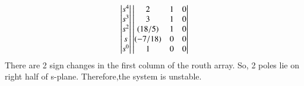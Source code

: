 \begin{enumerate}[label=\thesection.\arabic*.,ref=\thesection.\theenumi]
\begin{align}
\\
\begin{vmatrix}s^4\\s^3\\s^2\\s\\s^0\end{vmatrix}
\begin{vmatrix}2 & 1 & 0 \\ 3 & 1 & 0 \\ (18/5) & 1 & 0 \\ (-7/18) & 0 & 0 \\ 1 & 0 & 0\end{vmatrix}
\end{align}
%
There are 2 sign changes in the first column of the routh array. So, 2 poles lie on right half of s-plane.
Therefore,the system is unstable.
%
\end{enumerate}


